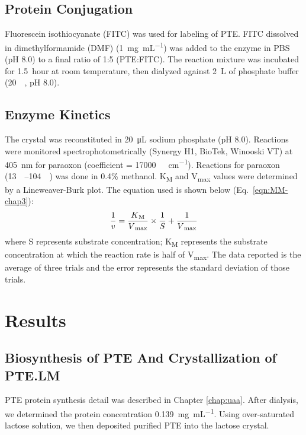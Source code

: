\begin{refsection}
\subsection{Protein Conjugation}

Fluorescein isothiocyanate (FITC) was used
for labeling of PTE. FITC dissolved in dimethylformamide (DMF)
(\SI{1}{\mg\per\mL}) was added to the enzyme in PBS (pH 8.0) to a final ratio
of 1:5 (PTE:FITC). The reaction mixture was incubated for \SI{1.5}{hour} at
room temperature, then dialyzed against \SI{2}{\liter} of phosphate buffer
(\SI{20}{\milli\Molar}, pH 8.0). 

\subsection{Enzyme Kinetics}

The crystal was reconstituted in \SI{20}{\micro\liter} sodium phosphate (pH
8.0). Reactions were monitored spectrophotometrically (Synergy H1, BioTek,
Winooski VT) at \SI{405}{\nm} for paraoxon (coefficient =
\SI{17000}{\per\Molar\per\cm}).  Reactions for paraoxon
(\SIrange{13}{104}{\micro\Molar}) was done in 0.4\% methanol.
K\textsubscript{M} and V\textsubscript{max} values were determined by a
Lineweaver-Burk plot.\cite{Baker2011b} The equation used is shown below
(Eq.~\ref{eqn:MM-chap3}): 
\begin{equation} 
    \frac{1}{v} =
    \frac{K\textsubscript{M}}{V\textsubscript{max}}\times\frac{1}{S} +
    \frac{1}{V\textsubscript{max}} 
    \label{eqn:MM-chap3}
\end{equation}
where S represents substrate concentration; K\textsubscript{M} represents the
substrate concentration at which the reaction rate is half of
V\textsubscript{max}. The data reported is the average of three trials and the
error represents the standard deviation of those trials.

\section{Results}

\subsection{Biosynthesis of PTE And Crystallization of PTE.LM}

PTE protein synthesis detail was described in Chapter \ref{chap:uaa}. After dialysis, we determined the protein concentration \SI{0.139}{\mg\per\mL}. Using over-saturated lactose solution, we then deposited purified PTE into the lactose crystal. 


\end{refsection}

